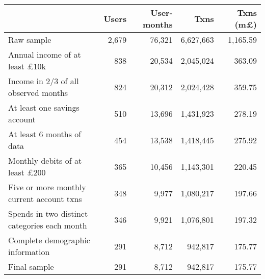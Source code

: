 \begin{tabular}{lrrrr}
\toprule
                                             & Users & User-months &      Txns & Txns (m\pounds) \\
\midrule
                                  Raw sample & 2,679 &      76,321 & 6,627,663 &        1,165.59 \\
        Annual income of at least \pounds10k &   838 &      20,534 & 2,045,024 &          363.09 \\
        Income in 2/3 of all observed months &   824 &      20,312 & 2,024,428 &          359.75 \\
                At least one savings account &   510 &      13,696 & 1,431,923 &          278.19 \\
                   At least 6 months of data &   454 &      13,538 & 1,418,445 &          275.92 \\
       Monthly debits of at least \pounds200 &   365 &      10,456 & 1,143,301 &          220.45 \\
   Five or more monthly current account txns &   348 &       9,977 & 1,080,217 &          197.66 \\
Spends in two distinct categories each month &   346 &       9,921 & 1,076,801 &          197.32 \\
            Complete demographic information &   291 &       8,712 &   942,817 &          175.77 \\
                                Final sample &   291 &       8,712 &   942,817 &          175.77 \\
\bottomrule
\end{tabular}
